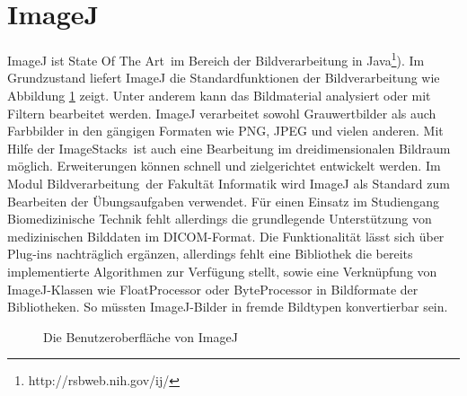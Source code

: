 \section{ImageJ}

ImageJ ist \glqq State Of The Art\grqq\ im Bereich der Bildverarbeitung in Java\footnote{http://rsbweb.nih.gov/ij/}). Im Grundzustand liefert ImageJ die Standardfunktionen der Bildverarbeitung wie Abbildung \ref{imagej} zeigt. Unter anderem kann das Bildmaterial analysiert oder mit Filtern bearbeitet werden. ImageJ verarbeitet sowohl Grauwertbilder als auch Farbbilder in den gängigen Formaten wie PNG, JPEG und vielen anderen. Mit Hilfe der \glqq ImageStacks\grqq\ ist auch eine Bearbeitung im dreidimensionalen Bildraum möglich. Erweiterungen können schnell und zielgerichtet entwickelt werden. Im Modul \glqq Bildverarbeitung\grqq\ der Fakultät Informatik wird ImageJ als Standard zum Bearbeiten der Übungsaufgaben verwendet. Für einen Einsatz im Studiengang Biomedizinische Technik fehlt allerdings die grundlegende Unterstützung von medizinischen Bilddaten im DICOM-Format. Die Funktionalität lässt sich über Plug-ins nachträglich ergänzen, allerdings fehlt eine Bibliothek die bereits implementierte Algorithmen zur Verfügung stellt, sowie eine Verknüpfung von ImageJ-Klassen wie FloatProcessor oder ByteProcessor in Bildformate der Bibliotheken. So müssten ImageJ-Bilder in fremde Bildtypen konvertierbar sein.

\begin{figure}[htbp]
  \vspace{0.5cm}
  \centering
  \caption{Die Benutzeroberfläche von ImageJ}
  \label{imagej}
  \vspace{0.5cm}
\end{figure}

